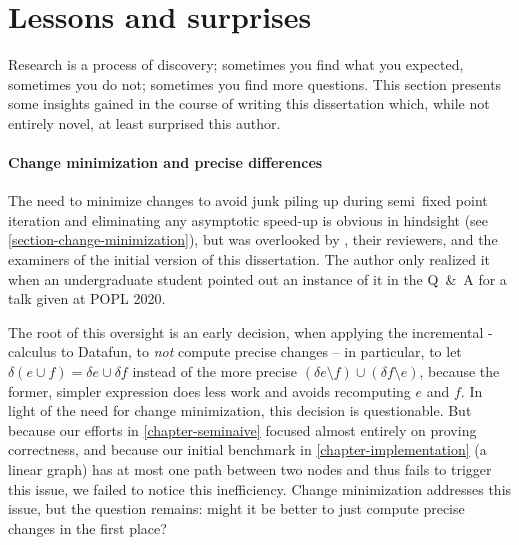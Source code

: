 

  




\section{Lessons and surprises}

Research is a process of discovery; sometimes you find what you expected,
sometimes you do not; sometimes you find more questions. This section presents
some insights gained in the course of writing this dissertation which, while not
entirely novel, at least surprised this author.

\paragraph{Change minimization and precise differences}

The need to minimize changes to avoid junk piling up during semi\naive\ fixed
point iteration and eliminating any asymptotic speed-up is obvious in hindsight
(see \cref{section-change-minimization}), but was overlooked by
\cite{seminaive-datafun}, their reviewers, and the examiners of the initial
version of this dissertation. The author only realized it when an undergraduate
student pointed out an instance of it in the Q~\&~A for a talk given at POPL
2020.

The root of this oversight is an early decision, when applying the incremental
\fn-calculus to Datafun, to \emph{not} compute precise changes -- in particular,
to let $\delta(e \cup f) = \delta e \cup \delta f$ instead of the more precise
$(\delta e \setminus f) \cup (\delta f \setminus e)$, because the former,
simpler expression does less work and avoids recomputing $e$ and $f$. In light
of the need for change minimization, this decision is questionable. But because
our efforts in \cref{chapter-seminaive} focused almost entirely on proving
correctness, and because our initial benchmark in \cref{chapter-implementation}
(a linear graph) has at most one path between two nodes and thus fails to
trigger this issue, we failed to notice this inefficiency.
%
Change minimization addresses this issue, but the question remains: might it be
better to just compute precise changes in the first place?

